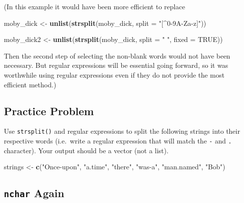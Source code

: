 \documentclass[
]{krantz}
\makeatletter
\newenvironment{Shaded}{\begin{snugshade}}{\end{snugshade}}
\newcommand{\DataTypeTok}[1]{\textcolor[rgb]{0.27,0.27,0.27}{#1}}
\newcommand{\KeywordTok}[1]{\textcolor[rgb]{0.27,0.27,0.27}{\textbf{#1}}}
\newcommand{\NormalTok}[1]{#1}
\newcommand{\OtherTok}[1]{\textcolor[rgb]{0.37,0.37,0.37}{#1}}
\newcommand{\StringTok}[1]{\textcolor[rgb]{0.5,0.5,0.5}{#1}}
\newenvironment{kframe}{%
\medskip{}
\setlength{\fboxsep}{.8em}
 \def\at@end@of@kframe{}%
 \ifinner\ifhmode%
  \def\at@end@of@kframe{\end{minipage}}%
  \begin{minipage}{\columnwidth}%
 \fi\fi%
 \def\FrameCommand##1{\hskip\@totalleftmargin \hskip-\fboxsep
 \colorbox{shadecolor}{##1}\hskip-\fboxsep
     \hskip-\linewidth \hskip-\@totalleftmargin \hskip\columnwidth}%
 \MakeFramed {\advance\hsize-\width
   \@totalleftmargin\z@ \linewidth\hsize
   \@setminipage}}%
 {\par\unskip\endMakeFramed%
 \at@end@of@kframe}
\renewenvironment{Shaded}{\begin{kframe}}{\end{kframe}}
\makeatother
\begin{document}
(In this example it would have been more efficient to replace

\begin{Shaded}
\begin{Highlighting}[]
\NormalTok{moby\_dick \textless{}{-}}\StringTok{ }\KeywordTok{unlist}\NormalTok{(}\KeywordTok{strsplit}\NormalTok{(moby\_dick, }\DataTypeTok{split =} \StringTok{"[\^{}0{-}9A{-}Za{-}z]"}\NormalTok{))}
\end{Highlighting}
\end{Shaded}

\begin{Shaded}
\begin{Highlighting}[]
\NormalTok{moby\_dick2 \textless{}{-}}\StringTok{ }\KeywordTok{unlist}\NormalTok{(}\KeywordTok{strsplit}\NormalTok{(moby\_dick, }\DataTypeTok{split =} \StringTok{" "}\NormalTok{, }\DataTypeTok{fixed =} \OtherTok{TRUE}\NormalTok{))}
\end{Highlighting}
\end{Shaded}

Then the second step of selecting the non-blank words would not have been necessary. But regular expressions will be essential going forward, so it was worthwhile using regular expressions even if they do not provide the most efficient method.)

\hypertarget{textPP1}{%
\subsection{Practice Problem}\label{textPP1}}

Use \texttt{strsplit()} and regular expressions to split the following strings into their respective words (i.e.~write a regular expression that will match the \texttt{-} and \texttt{.} character). Your output should be a vector (not a list).

\begin{Shaded}
\begin{Highlighting}[]
\NormalTok{strings \textless{}{-}}\StringTok{ }\KeywordTok{c}\NormalTok{(}\StringTok{"Once{-}upon"}\NormalTok{, }\StringTok{"a.time"}\NormalTok{, }\StringTok{"there"}\NormalTok{, }\StringTok{"was{-}a"}\NormalTok{, }\StringTok{"man.named"}\NormalTok{, }\StringTok{"Bob"}\NormalTok{)}
\end{Highlighting}
\end{Shaded}

\hypertarget{nchar-again}{%
\subsection{\texorpdfstring{\texttt{nchar} Again}{nchar Again}}\label{nchar-again}}
\end{document}
